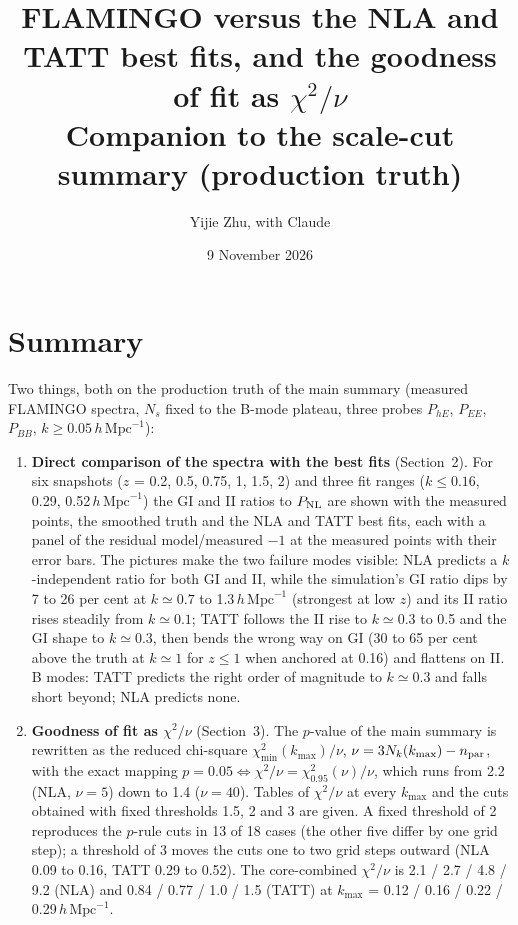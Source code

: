 \documentclass[11pt]{article}
\title{FLAMINGO versus the NLA and TATT best fits, and the goodness of fit as $\chi^2/\nu$\\[2pt]\large Companion to the scale-cut summary (production truth)}
\author{Yijie Zhu, with Claude}
\date{9 November 2026}
\newcommand{\hmpc}{\,h\,\mathrm{Mpc}^{-1}}
\newcommand{\kmax}{k_{\max}}
\begin{document}
\maketitle

\section*{Summary}

Two things, both on the production truth of the main summary (measured
FLAMINGO spectra, $N_s$ fixed to the B-mode plateau, three probes $P_{hE}$,
$P_{EE}$, $P_{BB}$, $k \ge 0.05\hmpc$):
\begin{enumerate}
\item \textbf{Direct comparison of the spectra with the best fits}
  (Section~2). For six snapshots ($z$ = 0.2, 0.5, 0.75, 1, 1.5, 2) and three
  fit ranges ($k \le 0.16$, 0.29, 0.52$\hmpc$) the GI and II ratios to
  $P_{\rm NL}$ are shown with the measured points, the smoothed truth and the
  NLA and TATT best fits, each with a panel of the residual model/measured $-1$ at the
  measured points with their error bars. The pictures make the two failure modes visible: NLA
  predicts a $k$-independent ratio for both GI and II, while the simulation's
  GI ratio dips by 7 to 26 per cent at $k \simeq 0.7$ to 1.3$\hmpc$
  (strongest at low $z$) and its II ratio rises steadily from $k \simeq 0.1$;
  TATT follows the II rise to $k \simeq 0.3$ to 0.5 and the GI shape to
  $k \simeq 0.3$, then bends the wrong way on GI (30 to 65 per cent above the
  truth at $k \simeq 1$ for $z \le 1$ when anchored at 0.16) and flattens on II. B modes:
  TATT predicts the right order of magnitude to $k \simeq 0.3$ and falls short
  beyond; NLA predicts none.
\item \textbf{Goodness of fit as $\chi^2/\nu$} (Section~3). The $p$-value
  of the main summary is rewritten as the reduced chi-square
  $\chi^2_{\min}(\kmax)/\nu$, $\nu = 3N_k(\kmax) - n_{\rm par}$, with the exact
  mapping $p = 0.05 \Leftrightarrow \chi^2/\nu = \chi^2_{0.95}(\nu)/\nu$,
  which runs from 2.2 (NLA, $\nu = 5$) down to 1.4 ($\nu = 40$). Tables of
  $\chi^2/\nu$ at every $\kmax$ and the cuts obtained with fixed thresholds
  1.5, 2 and 3 are given. A fixed threshold of 2 reproduces the $p$-rule cuts
  in 13 of 18 cases (the other five differ by one grid step); a threshold of
  3 moves the cuts one to two grid steps outward (NLA 0.09 to 0.16, TATT
  0.29 to 0.52). The
  core-combined $\chi^2/\nu$ is 2.1 / 2.7 / 4.8 / 9.2 (NLA) and 0.84 / 0.77 /
  1.0 / 1.5 (TATT) at $\kmax$ = 0.12 / 0.16 / 0.22 / 0.29$\hmpc$.
\end{enumerate}
\end{document}
